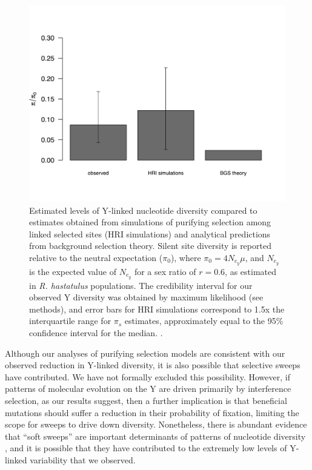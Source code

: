 \documentclass[9pt,twocolumn,twoside]{gsajnl}
\begin{document}
\begin{figure}[t!]
\centering
\noindent
\includegraphics[width=\linewidth]{figure4.jpg}
\caption{Estimated levels of Y-linked nucleotide diversity compared to estimates obtained from simulations of purifying selection among linked selected sites (HRI simulations) and analytical predictions from background selection theory. Silent site diversity is reported relative to the neutral expectation ($\pi_{0}$), where $\pi_{0} =4N_{e}_{y}\mu$, and $N_{e}_{y}$ is the expected value of $N_{e}_{y}$ for a sex ratio of $r=0.6$, as estimated in \textit{R. hastatulus} populations. The credibility interval for our observed Y diversity was obtained by maximum likelihood (see methods), and error bars for HRI simulations correspond to 1.5x the interquartile range for $\pi_{s}$ estimates, approximately equal to the 95\% confidence interval for the median. \citep{chambers1983graphical}.
}
\label{fig:ydiversity}
\end{figure}

Although our analyses of purifying selection models are consistent with our observed reduction in Y-linked diversity, it is also possible that selective sweeps have contributed. We have not formally excluded this possibility. However, if patterns of molecular evolution on the Y are driven primarily by interference selection, as our results suggest, then a further implication is that beneficial mutations should suffer a reduction in their probability of fixation, limiting the scope for sweeps to drive down diversity. Nonetheless, there is abundant evidence that “soft sweeps” are important determinants of patterns of nucleotide diversity \citep{messer2013population}, and it is possible that they have contributed to the extremely low levels of Y-linked variability that we observed.
\end{document}
